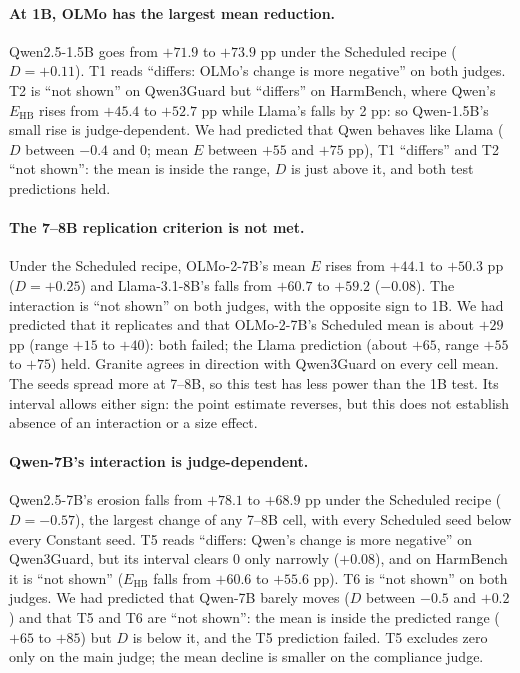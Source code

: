\documentclass[11pt]{article}
\newcommand{\Ehb}{E_{\mathrm{HB}}}
\begin{document}
\paragraph{At 1B, OLMo has the largest mean reduction.}
Qwen2.5-1.5B goes from $+71.9$ to $+73.9$ pp under the Scheduled recipe
($D = +0.11$). T1 reads ``differs: OLMo's change is more negative'' on both
judges. T2 is ``not shown'' on Qwen3Guard but ``differs'' on HarmBench, where
Qwen's $\Ehb$ rises from $+45.4$ to $+52.7$ pp while Llama's falls by 2 pp: so
Qwen-1.5B's small rise is judge-dependent. We had predicted that Qwen behaves
like Llama ($D$ between $-0.4$ and 0; mean $E$ between $+55$ and $+75$ pp), T1
``differs'' and T2 ``not shown'': the mean is inside the range, $D$ is just
above it, and both test predictions held.

\paragraph{The 7--8B replication criterion is not met.} Under the Scheduled
recipe, OLMo-2-7B's mean $E$ rises from $+44.1$ to $+50.3$ pp ($D = +0.25$)
and Llama-3.1-8B's falls from $+60.7$ to $+59.2$ ($-0.08$). The interaction is
``not shown'' on both judges, with the opposite sign to 1B. We had predicted
that it replicates and that OLMo-2-7B's Scheduled mean is about $+29$ pp
(range $+15$ to $+40$): both failed; the Llama prediction (about $+65$, range
$+55$ to $+75$) held. Granite agrees in direction with Qwen3Guard on every
cell mean. The seeds spread more at 7--8B, so this test has less power than
the 1B test. Its interval allows either sign: the point estimate reverses,
but this does not establish absence of an interaction or a size effect.

\paragraph{Qwen-7B's interaction is judge-dependent.}
Qwen2.5-7B's erosion falls from $+78.1$ to $+68.9$ pp under the Scheduled
recipe ($D = -0.57$), the largest change of any 7--8B cell, with every
Scheduled seed below every Constant seed. T5 reads ``differs: Qwen's change is
more negative'' on Qwen3Guard, but its interval clears 0 only narrowly
($+0.08$), and on HarmBench it is ``not shown'' ($\Ehb$ falls from $+60.6$ to
$+55.6$ pp). T6 is ``not shown'' on both judges. We had predicted that Qwen-7B
barely moves ($D$ between $-0.5$ and $+0.2$) and that T5 and T6 are ``not
shown'': the mean is inside the predicted range ($+65$ to $+85$) but $D$ is
below it, and the T5 prediction failed. T5 excludes zero only on the main
judge; the mean decline is smaller on the compliance judge.
\end{document}
